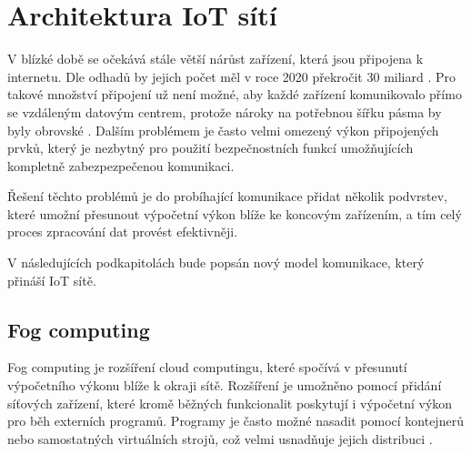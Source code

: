 \section{Architektura IoT sítí}
  V blízké době se očekává stále větší nárůst zařízení, která jsou připojena k internetu.
  Dle odhadů by jejich počet měl v roce 2020 překročit 30 miliard \cite{iotDevices}.
  Pro takové množství připojení už není možné, aby každé zařízení komunikovalo přímo
  se vzdáleným datovým centrem, protože nároky na potřebnou šířku pásma by byly 
  obrovské \cite{fog}.
  Dalším problémem je často velmi omezený výkon připojených prvků, který je nezbytný pro 
  použití bezpečnostních funkcí umožňujících kompletně zabezpezpečenou komunikaci. 
  
  Řešení těchto problémů je do probíhající komunikace přidat několik podvrstev, 
  které umožní přesunout výpočetní výkon blíže ke koncovým zařízením, a tím celý
  proces zpracování dat provést efektivněji.
  
  V následujících podkapitolách bude popsán nový model komunikace, který přináší 
  IoT sítě.
 \subsection{Fog computing} 
 Fog computing je rozšíření cloud computingu, které spočívá v přesunutí výpočetního
 výkonu blíže k okraji sítě. Rozšíření je umožněno pomocí přidání síťových zařízení,
 které kromě běžných funkcionalit poskytují i výpočetní výkon pro běh externích programů. Programy 
 je často možné nasadit pomocí kontejnerů nebo samostatných virtuálních strojů, což 
 velmi usnadňuje jejich distribuci \cite{fog}.
 
